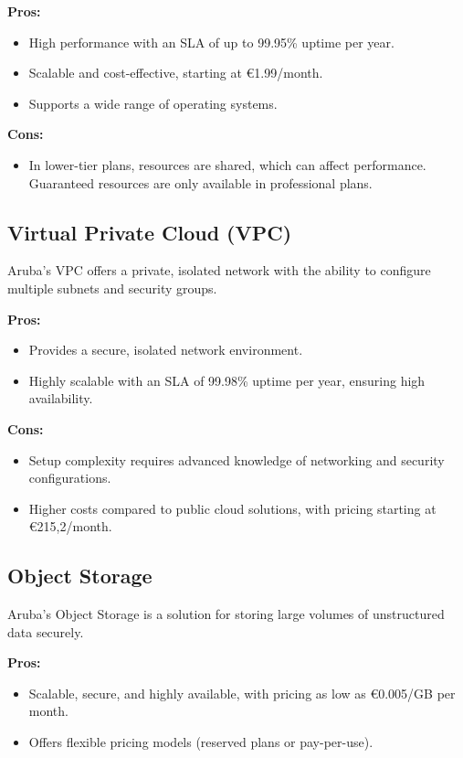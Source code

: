 \textbf{Pros:}
\begin{itemize}
    \item High performance with an SLA of up to 99.95\% uptime per year.
    \item Scalable and cost-effective, starting at €1.99/month.
    \item Supports a wide range of operating systems.
\end{itemize}

\textbf{Cons:}
\begin{itemize}
    \item In lower-tier plans, resources are shared, which can affect performance. Guaranteed resources are only available in professional plans.
\end{itemize}

\subsection*{Virtual Private Cloud (VPC)}
Aruba’s VPC offers a private, isolated network with the ability to configure multiple subnets and security groups.

\textbf{Pros:}
\begin{itemize}
    \item Provides a secure, isolated network environment.
    \item Highly scalable with an SLA of 99.98\% uptime per year, ensuring high availability.
\end{itemize}

\textbf{Cons:}
\begin{itemize}
    \item Setup complexity requires advanced knowledge of networking and security configurations.
    \item Higher costs compared to public cloud solutions, with pricing starting at €215,2/month.
\end{itemize}

\subsection*{Object Storage}
Aruba’s Object Storage is a solution for storing large volumes of unstructured data securely.

\textbf{Pros:}
\begin{itemize}
    \item Scalable, secure, and highly available, with pricing as low as €0.005/GB per month.
    \item Offers flexible pricing models (reserved plans or pay-per-use).
\end{itemize}

